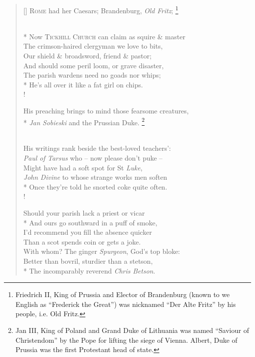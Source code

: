 \documentclass[openany]{amsbook}
\newcommand\blfootnote[1]{%
    \begingroup
    \renewcommand\thefootnote{}\footnote{#1}%
    \addtocounter{footnote}{-1}%
    \endgroup
}
\begin{document}
\settowidth{\versewidth}{His preaching brings to mind those fearsome creatures,}
\begin{verse}[\versewidth]
\textsc{Rome} had her Caesars; Brandenburg, \textit{Old Fritz};\blfootnote{Friedrich II, King of Prussia and Elector of Brandenburg (known to we English as ``Frederick the Great'') was nicknamed ``Der Alte Fritz'' by his people, i.e. Old Fritz.}\\*
\vin Now \textsc{Tickhill Church} can claim as squire \& master\\
The crimson-haired clergyman we love to bits,\\
\vin Our shield \& broadsword, friend \& pastor;\\
\vin And should some peril loom, or grave disaster,\\
The parish wardens need no goads nor whips;\\*
He's all over it like a fat girl on chips.\\!

His preaching brings to mind those fearsome creatures,\\*
\vin \textit{Jan Sobieski} and the Prussian Duke.\blfootnote{Jan III, King of Poland and Grand Duke of Lithuania was named ``Saviour of Christendom'' by the Pope for lifting the siege of Vienna. Albert, Duke of Prussia was the first Protestant head of state.}\\
His writings rank beside the best-loved teachers':\\
\vin \textit{Paul of Tarsus} who -- now please don't puke --\\
\vin Might have had a soft spot for St \textit{Luke},\\
\textit{John Divine} to whose strange works men soften\\*
Once they're told he snorted coke quite often.\\!

Should your parish lack a priest or vicar\\*
\vin And ours go southward in a puff of smoke,\\
I'd recommend you fill the absence quicker\\
\vin Than a scot spends coin or gets a joke.\\
\vin With whom? The ginger \textit{Spurgeon}, God's top bloke:\\
Better than bovril, sturdier than a stetson,\\*
The incomparably reverend \textit{Chris Betson}.
\end{verse}
\end{document}
